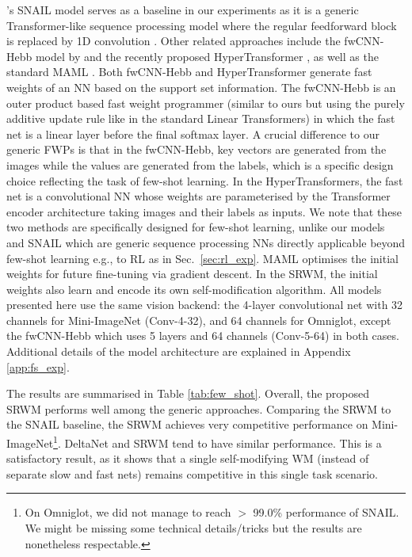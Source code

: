 \documentclass[nohyperref]{article}
\theoremstyle{plain}
\theoremstyle{definition}
\theoremstyle{remark}
\begin{document}
\citet{mishra2018a}'s SNAIL model
serves as a baseline in our experiments
as it is a generic Transformer-like sequence processing model where the regular feedforward block is replaced by 1D convolution \citep{waibel1989phoneme}.
Other related approaches include the fwCNN-Hebb model by \citet{munkhdalai2018metalearning} and the recently proposed HyperTransformer \citep{zhmoginov2022hypertransformer}, as well as the standard MAML \citep{FinnAL17, FinnL18}.
Both fwCNN-Hebb and HyperTransformer generate fast weights of an NN based on the support set information.
The fwCNN-Hebb is an outer product based fast weight programmer (similar to ours but using the purely additive update rule like in the standard Linear Transformers) in which the fast net is a linear layer before the final softmax layer.
A crucial difference to our generic FWPs is that in the fwCNN-Hebb, key vectors are generated from the images while the values are generated from the labels, which is a specific design choice reflecting the task of few-shot learning.
In the HyperTransformers, the fast net is a convolutional NN whose weights are parameterised by the Transformer encoder architecture taking images and their labels as inputs.
We note that these two methods are specifically designed for few-shot learning,
unlike our models and SNAIL which are generic sequence processing NNs directly applicable beyond few-shot learning e.g., to RL as in Sec.~\ref{sec:rl_exp}.
MAML optimises the initial weights for future fine-tuning via gradient descent.
In the SRWM, the initial weights also learn and encode its own self-modification algorithm.
All models presented here use the same vision backend: the 4-layer convolutional net \citep{VinyalsBLKW16} with 32 channels for Mini-ImageNet (Conv-4-32), and 64 channels for Omniglot,
except the fwCNN-Hebb which uses 5 layers and 64 channels (Conv-5-64) in both cases.
Additional details of the model architecture are explained in Appendix \ref{app:fs_exp}.

The results are summarised in Table \ref{tab:few_shot}.
Overall, the proposed SRWM performs
well among the generic approaches.
Comparing the SRWM
to the SNAIL baseline,
the SRWM achieves very competitive performance on Mini-ImageNet\footnote{On Omniglot, we did not manage to reach $>$ 99.0\% performance of SNAIL.
We might be missing some technical details/tricks but
the results are nonetheless respectable.}.
DeltaNet and SRWM tend to have similar performance.
This is a satisfactory result, as it shows that a single self-modifying WM (instead of separate slow and fast nets) remains competitive in this single task scenario.
\end{document}
